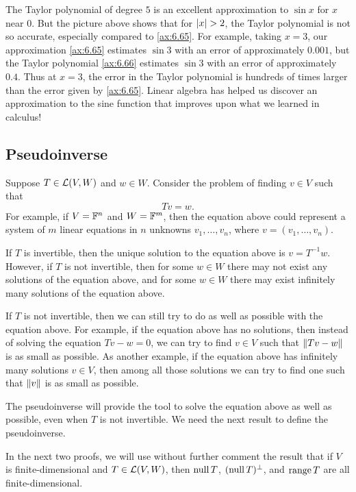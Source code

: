 \begin{example}
The Taylor polynomial of degree $5$ is an excellent approximation to $\sin x$
for $x$ near $0$. But the picture above shows that for $\lvert x \rvert>2$, the Taylor
polynomial is not so accurate, especially compared to \ref{ax:6.65}. For
example, taking $x=3$, our approximation \ref{ax:6.65} estimates $\sin 3$ with
an error of approximately $0.001$, but the Taylor polynomial \ref{ax:6.66}
estimates $\sin 3$ with an error of approximately $0.4$. Thus at $x=3$, the
error in the Taylor polynomial is hundreds of times larger than the error given
by \ref{ax:6.65}. Linear algebra has helped us discover an approximation to the
sine function that improves upon what we learned in calculus!
\end{example}

\subsection{Pseudoinverse}

Suppose $T\in\mathcal{L}(V,W)$ and $w\in W$. Consider the problem of finding $v\in V$
such that
\[ Tv = w. \]
For example, if $V=\mathbb{F}^n$ and $W=\mathbb{F}^m$, then the equation above could represent
a system of $m$ linear equations in $n$ unknowns $v_1,\dots,v_n$, where
$v=(v_1,\dots,v_n)$.

If $T$ is invertible, then the unique solution to the equation above is
$v=T^{-1}w$. However, if $T$ is not invertible, then for some $w\in W$ there
may not exist any solutions of the equation above, and for some $w\in W$ there
may exist infinitely many solutions of the equation above.

If $T$ is not invertible, then we can still try to do as well as possible with
the equation above. For example, if the equation above has no solutions, then
instead of solving the equation $Tv-w=0$, we can try to find $v\in V$ such that
$\lVert Tv-w \rVert$ is as small as possible. As another example, if the equation
above has infinitely many solutions $v\in V$, then among all those solutions we
can try to find one such that $\lVert v \rVert$ is as small as possible.

The pseudoinverse will provide the tool to solve the equation above as well as
possible, even when $T$ is not invertible. We need the next result to define
the pseudoinverse.

In the next two proofs, we will use without further comment the result that if
$V$ is finite-dimensional and $T\in\mathcal{L}(V,W)$, then $\operatorname{null} T$,
$(\operatorname{null} T)^\perp$, and $\operatorname{range} T$ are all finite-dimensional.

